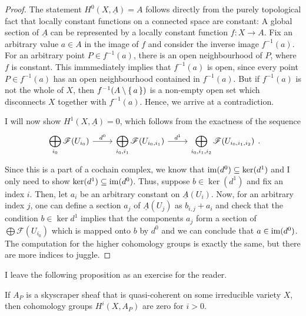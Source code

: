\begin{proof}
  The statement $H^{0}(X,\underline{A})=A$ follows directly from the purely
  topological fact that locally constant functions on a connected space
  are constant: A global section of $\underline{A}$ can be represented
  by a locally constant function $f:X\to A$. Fix an arbitrary value $a\in A$
  in the image of $f$ and consider the inverse image $f^{-1}(a)$. For an arbitrary point
  $P\in f^{-1}(a)$, there is an open neighbourhood of $P$, where $f$ is
  constant. This immmediately implies that $f^{-1}(a)$ is open, since every
  point $P\in f^{-1}(a)$ has an open neighbourhood contained in $f^{-1}(a)$.
  But if $f^{-1}(a)$ is not the whole of $X$, then $f^{-1}(A\setminus\set{a})$
  is a non-empty open set which disconnects $X$ together with $f^{-1}(a)$.
  Hence, we arrive at a contradiction.

  I will now show $H^{1}(X,\underline{A})=0$, which follows from the
  exactness of the sequence
  \[\begin{tikzcd}
      \displaystyle\bigoplus_{i_{0}}\mathscr{F}(U_{i_{0}})\rar{d^{0}}
      & \displaystyle\bigoplus_{i_{0},i_{1}}\mathscr{F}(U_{i_{0},i_{1}})
      \rar{d^{1}}
      & \displaystyle\bigoplus_{i_{0},i_{1},i_{2}}
      \mathscr{F}(U_{i_{0},i_{1},i_{2}})
    \end{tikzcd}.\]
  Since this is a part of a cochain complex, we know that $\operatorname{im}(d^{0})
  \subseteq\ker(d^{1})$ and I only need to show $\ker(d^{1})\subseteq
  \operatorname{im}(d^{0})$. Thus, suppose $b\in\ker(d^{1})$ and fix an index $i$. Then,
  let $a_{i}$ be an arbitrary constant on $\underline{A}(U_{i})$. Now, for
  an arbitrary index $j$, one can define a section $a_{j}$ of
  $\underline{A}(U_{j})$ as $b_{i, j}+a_{i}$ and check that the condition
  $b\in\ker d^{1}$ implies that the components $a_{j}$ form a section of
  $\displaystyle\bigoplus\mathscr{F}(U_{i_{0}})$ which is mapped onto $b$
  by $d^{0}$ and we can conclude that $a\in\operatorname{im}(d^{0})$. The computation for
  the higher cohomology groups is exactly the same, but there are more
  indices to juggle.
\end{proof}
I leave the following proposition as an exercise for the reader.
\begin{prop}\label{prop:sky_cohom}
  If $A_{P}$ is a skyscraper sheaf that is quasi-coherent on some
  irreducible variety $X$, then cohomology groups $H^{i}(X,A_{P})$ are zero
  for $i>0$.
\end{prop}
